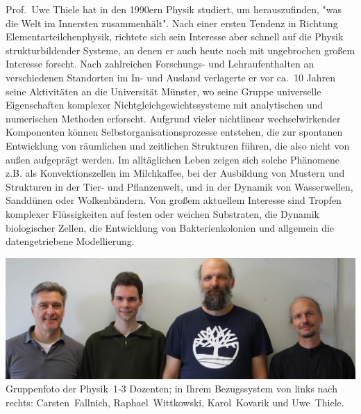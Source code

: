 \begin{multicols}{2}
Prof.\ Uwe Thiele hat in den 1990ern Physik studiert, um herauszufinden, "was die Welt im Innersten zusammenhält". Nach einer ersten Tendenz in Richtung Elementarteilchenphysik, richtete sich sein Interesse aber schnell auf die Physik strukturbildender Systeme, an denen er auch heute noch mit ungebrochen großem Interesse forscht. Nach zahlreichen Forschungs- und Lehraufenthalten an verschiedenen Standorten im In- und Ausland verlagerte er vor ca.\ 10 Jahren seine Aktivitäten an die Universität Münster, wo seine Gruppe universelle Eigenschaften komplexer Nichtgleichgewichtssysteme mit analytischen und numerischen Methoden erforscht. Aufgrund vieler nichtlinear wechselwirkender Komponenten können Selbstorganisationsprozesse entstehen, die zur spontanen Entwicklung von räumlichen und zeitlichen Strukturen führen, die also nicht von au{\ss}en aufgeprägt werden. Im alltäglichen Leben zeigen sich solche Phänomene z.B. als Konvektionszellen im Milchkaffee, bei der Ausbildung von Mustern und Strukturen in der Tier- und Pflanzenwelt, und in der Dynamik von Wasserwellen, Sanddünen oder Wolkenbändern. Von gro{\ss}em aktuellem Interesse sind Tropfen komplexer Flüssigkeiten auf festen oder weichen Substraten, die Dynamik biologischer Zellen, die Entwicklung von Bakterienkolonien und allgemein die datengetriebene Modellierung.

\end{multicols}

\begin{center}
\includegraphics[width=0.6\columnwidth, height=0.35\textheight]{res/vorstellungsfotos/profs_ws23.jpg}\\
\smallskip
Gruppenfoto der Physik~1-3 Dozenten; in Ihrem Bezugssystem von links nach rechts: Carsten~Fallnich, Raphael~Wittkowski, Karol~Kovarik und Uwe~Thiele.
\end{center}

\newpage

